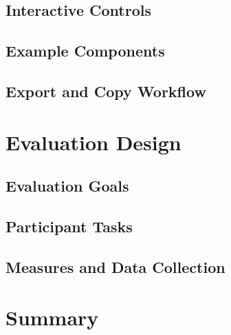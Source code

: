 \subsection{Interactive Controls}
\subsection{Example Components}
\subsection{Export and Copy Workflow}

\section{Evaluation Design}
\subsection{Evaluation Goals}
\subsection{Participant Tasks}
\subsection{Measures and Data Collection}

\section{Summary}
